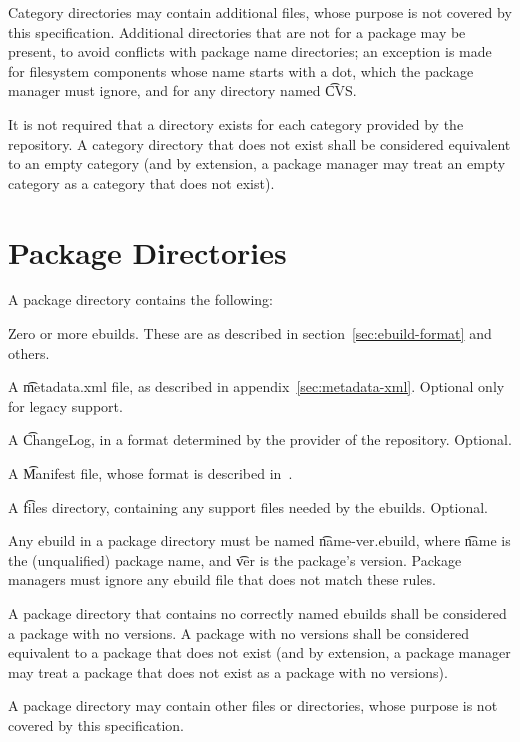 Category directories may contain additional files, whose purpose is not covered by this
specification. Additional directories that are not for a package may  be present, to avoid
conflicts with package name directories; an exception is made for filesystem components whose name
starts with a dot, which the package manager must ignore, and for any directory named \t{CVS}.

It is not required that a directory exists for each category provided by the repository. A category
directory that does not exist shall be considered equivalent to an empty category (and by extension,
a package manager may treat an empty category as a category that does not exist).

\section{Package Directories}
\label{sec:package-dirs}

A package directory contains the following:
\begin{compactitem}
\item Zero or more ebuilds. These are as described in section~\ref{sec:ebuild-format} and others.
\item A \t{metadata.xml} file, as described in appendix~\ref{sec:metadata-xml}\@. Optional only for
    legacy support.
\item A \t{ChangeLog}, in a format determined by the provider of the repository. Optional.
\item A \t{Manifest} file, whose format is described in~\cite{Glep44}.
\item A \t{files} directory, containing any support files needed by the ebuilds. Optional.
\end{compactitem}

Any ebuild in a package directory must be named \t{name-ver.ebuild}, where \t{name} is the
(unqualified) package name, and \t{ver} is the package's version. Package managers must ignore
any ebuild file that does not match these rules.

A package directory that contains no correctly named ebuilds shall be considered a package with no
versions. A package with no versions shall be considered equivalent to a package that does not
exist (and by extension, a package manager may treat a package that does not exist as a package
with no versions).

A package directory may contain other files or directories, whose purpose is not covered by
this specification.

